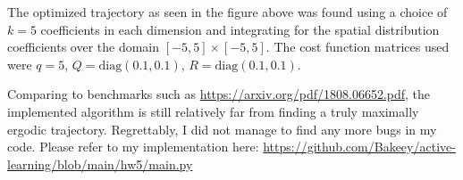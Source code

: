The optimized trajectory as seen in the figure above was found using a choice of $k=5$ coefficients in each dimension and integrating for the spatial distribution coefficients over the domain $[-5,5]\times[-5,5]$. 
The cost function matrices used were $q=5$, $Q=\textrm{diag}(0.1,0.1)$, $R=\textrm{diag}(0.1,0.1)$.

Comparing to benchmarks such as \url{https://arxiv.org/pdf/1808.06652.pdf}, the implemented algorithm is still relatively far from finding a truly maximally ergodic trajectory. 
Regrettably, I did not manage to find any more bugs in my code. Please refer to my implementation here: \url{https://github.com/Bakeey/active-learning/blob/main/hw5/main.py}